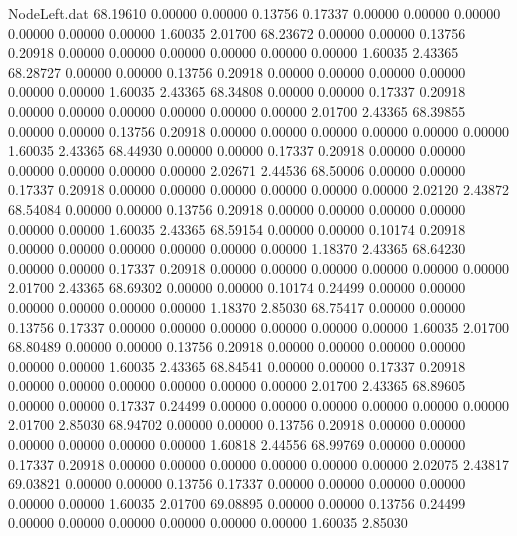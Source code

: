 \begin{filecontents}{NodeLeft.dat}
  68.19610    0.00000    0.00000     0.13756    0.17337    0.00000    0.00000    0.00000    0.00000    0.00000    0.00000    1.60035    2.01700
  68.23672    0.00000    0.00000     0.13756    0.20918    0.00000    0.00000    0.00000    0.00000    0.00000    0.00000    1.60035    2.43365
  68.28727    0.00000    0.00000     0.13756    0.20918    0.00000    0.00000    0.00000    0.00000    0.00000    0.00000    1.60035    2.43365
  68.34808    0.00000    0.00000     0.17337    0.20918    0.00000    0.00000    0.00000    0.00000    0.00000    0.00000    2.01700    2.43365
  68.39855    0.00000    0.00000     0.13756    0.20918    0.00000    0.00000    0.00000    0.00000    0.00000    0.00000    1.60035    2.43365
  68.44930    0.00000    0.00000     0.17337    0.20918    0.00000    0.00000    0.00000    0.00000    0.00000    0.00000    2.02671    2.44536
  68.50006    0.00000    0.00000     0.17337    0.20918    0.00000    0.00000    0.00000    0.00000    0.00000    0.00000    2.02120    2.43872
  68.54084    0.00000    0.00000     0.13756    0.20918    0.00000    0.00000    0.00000    0.00000    0.00000    0.00000    1.60035    2.43365
  68.59154    0.00000    0.00000     0.10174    0.20918    0.00000    0.00000    0.00000    0.00000    0.00000    0.00000    1.18370    2.43365
  68.64230    0.00000    0.00000     0.17337    0.20918    0.00000    0.00000    0.00000    0.00000    0.00000    0.00000    2.01700    2.43365
  68.69302    0.00000    0.00000     0.10174    0.24499    0.00000    0.00000    0.00000    0.00000    0.00000    0.00000    1.18370    2.85030
  68.75417    0.00000    0.00000     0.13756    0.17337    0.00000    0.00000    0.00000    0.00000    0.00000    0.00000    1.60035    2.01700
  68.80489    0.00000    0.00000     0.13756    0.20918    0.00000    0.00000    0.00000    0.00000    0.00000    0.00000    1.60035    2.43365
  68.84541    0.00000    0.00000     0.17337    0.20918    0.00000    0.00000    0.00000    0.00000    0.00000    0.00000    2.01700    2.43365
  68.89605    0.00000    0.00000     0.17337    0.24499    0.00000    0.00000    0.00000    0.00000    0.00000    0.00000    2.01700    2.85030
  68.94702    0.00000    0.00000     0.13756    0.20918    0.00000    0.00000    0.00000    0.00000    0.00000    0.00000    1.60818    2.44556
  68.99769    0.00000    0.00000     0.17337    0.20918    0.00000    0.00000    0.00000    0.00000    0.00000    0.00000    2.02075    2.43817
  69.03821    0.00000    0.00000     0.13756    0.17337    0.00000    0.00000    0.00000    0.00000    0.00000    0.00000    1.60035    2.01700
  69.08895    0.00000    0.00000     0.13756    0.24499    0.00000    0.00000    0.00000    0.00000    0.00000    0.00000    1.60035    2.85030

\end{filecontents}
